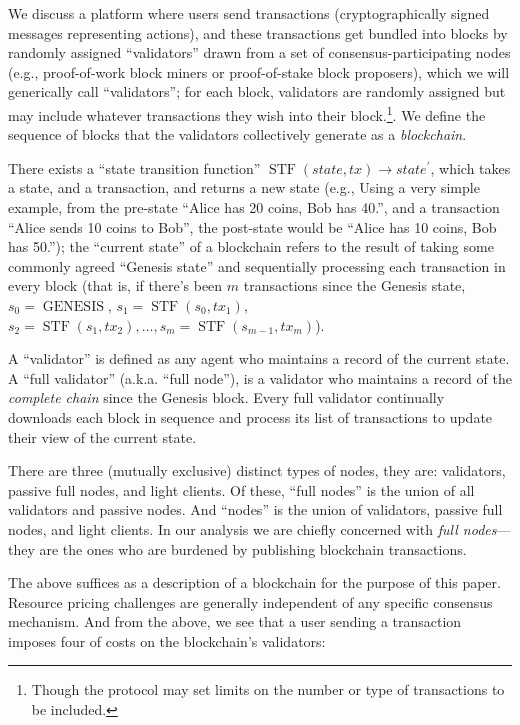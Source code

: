 \documentclass[12pt, final]{article}
\newcommand{\fname}[1]{ \operatorname{ #1 } }
\begin{document}
We discuss a platform where users send transactions (cryptographically signed messages representing actions), and these transactions get bundled into blocks by randomly assigned ``validators'' drawn from a set of consensus-participating nodes (e.g., proof-of-work block miners or proof-of-stake block proposers), which we will generically call ``validators''; for each block, validators are randomly assigned but may include whatever transactions they wish into their block.\footnote{Though the protocol may set limits on the number or type of transactions to be included.}. We define the sequence of blocks that the validators collectively generate as a \emph{blockchain}.

There exists a ``state transition function'' $\fname{STF}(state, tx) \rightarrow state^\prime$, which takes a state, and a transaction, and returns a new state (e.g., Using a very simple example, from the pre-state ``Alice has 20 coins, Bob has 40.'', and a transaction ``Alice sends 10 coins to Bob'', the post-state would be ``Alice has 10 coins, Bob has 50.''); the ``current state'' of a blockchain refers to the result of taking some commonly agreed ``Genesis state'' and sequentially processing each transaction in every block (that is, if there's been $m$ transactions since the Genesis state, $s_0 = \fname{GENESIS}$, $s_1 = \fname{STF}(s_0, tx_1)$, $s_2 = \fname{STF}(s_1, tx_2), \ldots, s_m = \fname{STF}(s_{m-1}, tx_m)$).

A ``validator'' is defined as any agent who maintains a record of the current state.  A ``full validator'' (a.k.a. ``full node''), is a validator who maintains a record of the \emph{complete chain} since the Genesis block.  Every full validator continually downloads each block in sequence and process its list of transactions to update their view of the current state.

There are three (mutually exclusive) distinct types of nodes, they are: validators, passive full nodes, and light clients.  Of these, ``full nodes'' is the union of all validators and passive nodes.  And ``nodes'' is the union of validators, passive full nodes, and light clients.  In our analysis we are chiefly concerned with \emph{full nodes}---they are the ones who are burdened by publishing blockchain transactions.


The above suffices as a description of a blockchain for the purpose of this paper. Resource pricing challenges are generally independent of any specific consensus mechanism.  And from the above, we see that a user sending a transaction imposes four of costs on the blockchain's validators:
\end{document}
